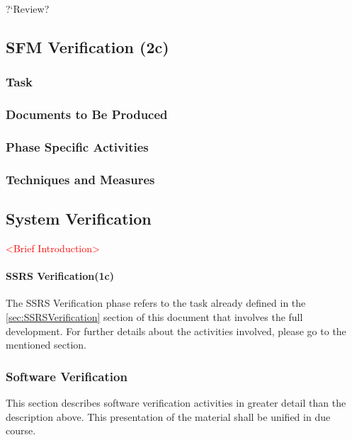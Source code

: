 \documentclass{template/openetcs_report}
\newcommand{\qq}[1]{?`#1?}
\begin{document}
\qq{Review}



\subsection{SFM Verification (2c)}
\label{sec:sfm-verif-verification}

\subsubsection{Task}
\label{sec:sfm-verif-task}

\subsubsection{Documents to Be Produced}
\label{sec:sfm-verif-docum-be-prod}

\subsubsection{Phase Specific Activities}
\label{sec:sfm-verif-phase-spec-activ}

\subsubsection{Techniques and Measures}
\label{sec:sfm-verif-techniques-measures}





\subsection{System Verification}
\textcolor{red}{<Brief Introduction>}

\paragraph{SSRS Verification(1c)}
The SSRS Verification phase refers to the task already defined in the \ref{sec:SSRSVerification} section of this document that involves the full development. 
For further details about the activities involved, please go to the mentioned section.

\subsubsection{Software Verification}
\label{sec:sw-verif}

This section describes software verification activities in greater detail than the description above. This presentation of the material shall be unified in due course.
\end{document}
